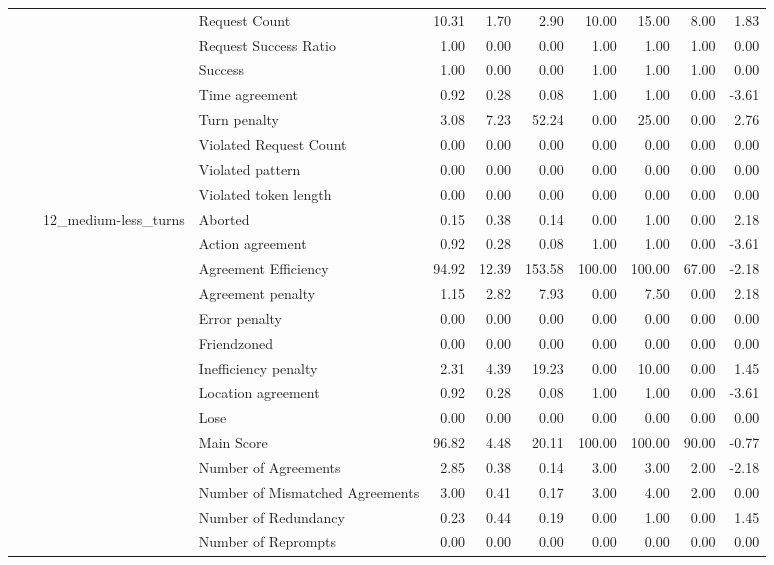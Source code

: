 \begin{tabular}{llllrrrrrrr}
 &  &  & Request Count & 10.31 & 1.70 & 2.90 & 10.00 & 15.00 & 8.00 & 1.83 \\
 &  &  & Request Success Ratio & 1.00 & 0.00 & 0.00 & 1.00 & 1.00 & 1.00 & 0.00 \\
 &  &  & Success & 1.00 & 0.00 & 0.00 & 1.00 & 1.00 & 1.00 & 0.00 \\
 &  &  & Time agreement & 0.92 & 0.28 & 0.08 & 1.00 & 1.00 & 0.00 & -3.61 \\
 &  &  & Turn penalty & 3.08 & 7.23 & 52.24 & 0.00 & 25.00 & 0.00 & 2.76 \\
 &  &  & Violated Request Count & 0.00 & 0.00 & 0.00 & 0.00 & 0.00 & 0.00 & 0.00 \\
 &  &  & Violated pattern & 0.00 & 0.00 & 0.00 & 0.00 & 0.00 & 0.00 & 0.00 \\
 &  &  & Violated token length & 0.00 & 0.00 & 0.00 & 0.00 & 0.00 & 0.00 & 0.00 \\
\cline{3-11}
 &  & \multirow[t]{27}{*}{12_medium-less_turns} & Aborted & 0.15 & 0.38 & 0.14 & 0.00 & 1.00 & 0.00 & 2.18 \\
 &  &  & Action agreement & 0.92 & 0.28 & 0.08 & 1.00 & 1.00 & 0.00 & -3.61 \\
 &  &  & Agreement Efficiency & 94.92 & 12.39 & 153.58 & 100.00 & 100.00 & 67.00 & -2.18 \\
 &  &  & Agreement penalty & 1.15 & 2.82 & 7.93 & 0.00 & 7.50 & 0.00 & 2.18 \\
 &  &  & Error penalty & 0.00 & 0.00 & 0.00 & 0.00 & 0.00 & 0.00 & 0.00 \\
 &  &  & Friendzoned & 0.00 & 0.00 & 0.00 & 0.00 & 0.00 & 0.00 & 0.00 \\
 &  &  & Inefficiency penalty & 2.31 & 4.39 & 19.23 & 0.00 & 10.00 & 0.00 & 1.45 \\
 &  &  & Location agreement & 0.92 & 0.28 & 0.08 & 1.00 & 1.00 & 0.00 & -3.61 \\
 &  &  & Lose & 0.00 & 0.00 & 0.00 & 0.00 & 0.00 & 0.00 & 0.00 \\
 &  &  & Main Score & 96.82 & 4.48 & 20.11 & 100.00 & 100.00 & 90.00 & -0.77 \\
 &  &  & Number of Agreements & 2.85 & 0.38 & 0.14 & 3.00 & 3.00 & 2.00 & -2.18 \\
 &  &  & Number of Mismatched Agreements & 3.00 & 0.41 & 0.17 & 3.00 & 4.00 & 2.00 & 0.00 \\
 &  &  & Number of Redundancy & 0.23 & 0.44 & 0.19 & 0.00 & 1.00 & 0.00 & 1.45 \\
 &  &  & Number of Reprompts & 0.00 & 0.00 & 0.00 & 0.00 & 0.00 & 0.00 & 0.00 \\

\end{tabular}
